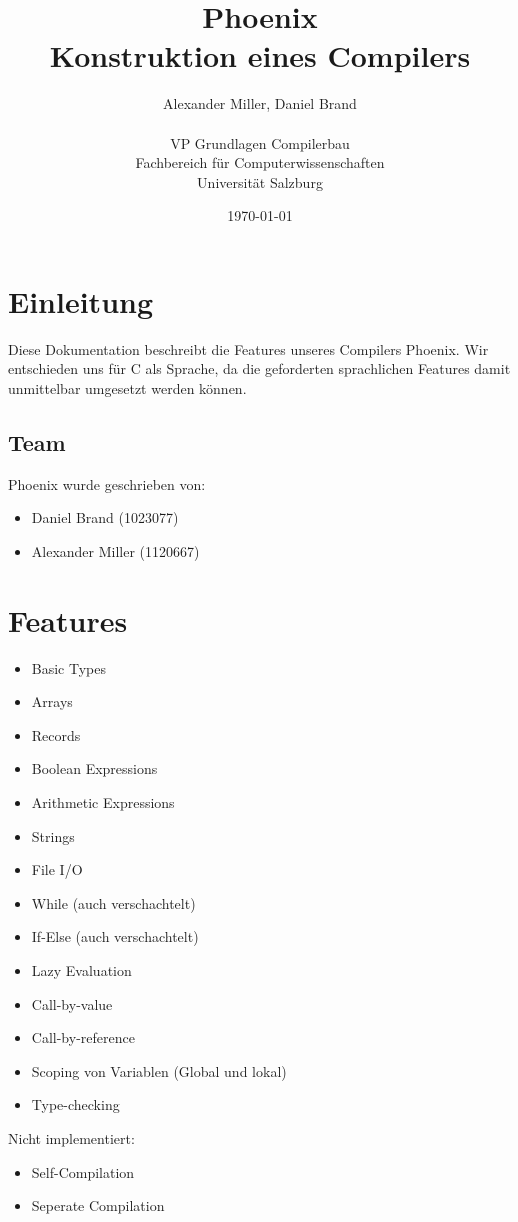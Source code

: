 \documentclass[a4paper]{article}
\title{Phoenix \\ \large Konstruktion eines Compilers}
\author{Alexander Miller, Daniel Brand \\ \\
		VP Grundlagen Compilerbau \\
		Fachbereich für Computerwissenschaften \\
		Universität Salzburg}
\date{\today}
\begin{document}
	\maketitle
	\tableofcontents

	\section{Einleitung}
	Diese Dokumentation beschreibt die Features unseres Compilers Phoenix.
	Wir entschieden uns für C als Sprache, da die geforderten sprachlichen Features damit unmittelbar umgesetzt werden können.

	\subsection{Team}
	Phoenix wurde geschrieben von:
	\begin{itemize}
		\item Daniel Brand (1023077)
		\item Alexander Miller (1120667)
	\end{itemize}

	\section{Features}
	\begin{multicols}{2}
	\begin{itemize}
		\item Basic Types
		\item Arrays
		\item Records
		\item Boolean Expressions
		\item Arithmetic Expressions
		\item Strings
		\item File I/O
		\item While (auch verschachtelt)
		\item If-Else (auch verschachtelt)
		\item Lazy Evaluation
		\item Call-by-value
		\item Call-by-reference
		\item Scoping von Variablen (Global und lokal)
		\item Type-checking
	\end{itemize}
	\end{multicols}

	Nicht implementiert:
	\begin{itemize}
		\item Self-Compilation
		\item Seperate Compilation
	\end{itemize}
\end{document}
